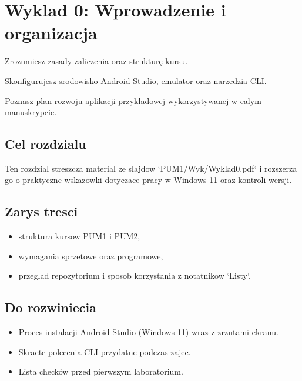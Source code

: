 \chapter{Wyklad 0: Wprowadzenie i organizacja}

\begin{learningobjectives}
  \item Zrozumiesz zasady zaliczenia oraz struktur\k e kursu.
  \item Skonfigurujesz srodowisko Android Studio, emulator oraz narzedzia CLI.
  \item Poznasz plan rozwoju aplikacji przykladowej wykorzystywanej w calym manuskrypcie.
\end{learningobjectives}

\section{Cel rozdzialu}
Ten rozdzial streszcza material ze slajdow `PUM1/Wyk/Wyklad0.pdf` i rozszerza go o praktyczne wskazowki dotyczace pracy w Windows 11 oraz kontroli wersji.

\section{Zarys tresci}
\begin{itemize}
  \item struktura kursow PUM1 i PUM2,
  \item wymagania sprzetowe oraz programowe,
  \item przeglad repozytorium i sposob korzystania z notatnikow `Listy`.
\end{itemize}

\section{Do rozwiniecia}
\begin{itemize}
  \item Proces instalacji Android Studio (Windows 11) wraz z zrzutami ekranu.
  \item Skracte polecenia CLI przydatne podczas zajec.
  \item Lista checków przed pierwszym laboratorium.
\end{itemize}

